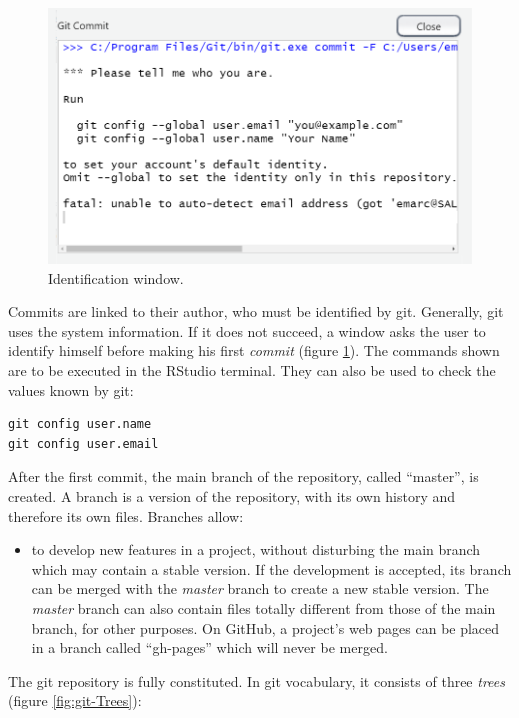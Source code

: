 \documentclass[
  12pt,
  american,
  a4paper,
  extrafontsizes,onecolumn,openright
  ]{memoir}
\providecommand{\tightlist}{%
  \setlength{\itemsep}{0pt}\setlength{\parskip}{0pt}}
\begin{document}
\begin{figure}

{\centering \includegraphics[width=0.8\linewidth]{images/git-id} 

}

\caption{Identification window.}\label{fig:git-id}
\end{figure}

\normalsize

Commits are linked to their author, who must be identified by git.
Generally, git uses the system information.
If it does not succeed, a window asks the user to identify himself before making his first \emph{commit} (figure \ref{fig:git-id}).
The commands shown are to be executed in the RStudio terminal.
They can also be used to check the values known by git:

\begin{verbatim}
git config user.name
git config user.email
\end{verbatim}

After the first commit, the main branch of the repository, called \enquote{master}, is created.
A branch is a version of the repository, with its own history and therefore its own files.
Branches allow:

\begin{itemize}
\tightlist
\item
  to develop new features in a project, without disturbing the main branch which may contain a stable version. If the development is accepted, its branch can be merged with the \emph{master} branch to create a new stable version.
  The \emph{master} branch can also contain files totally different from those of the main branch, for other purposes. On GitHub, a project's web pages can be placed in a branch called \enquote{gh-pages} which will never be merged.
\end{itemize}

The git repository is fully constituted.
In git vocabulary, it consists of three \emph{trees} (figure \ref{fig:git-Trees}):
\end{document}

